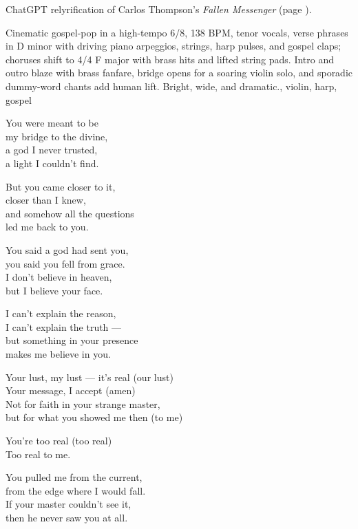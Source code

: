 
\begin{notes}
ChatGPT relyrification of Carlos Thompson's \emph{Fallen Messenger} (page \pageref{sec:fallen-messenger}).
\end{notes}
\begin{style}
Cinematic gospel-pop in a high-tempo 6/8, 138 BPM, tenor vocals, verse phrases in D minor with driving piano arpeggios, strings, harp pulses, and gospel claps; choruses shift to 4/4 F major with brass hits and lifted string pads. Intro and outro blaze with brass fanfare, bridge opens for a soaring violin solo, and sporadic dummy-word chants add human lift. Bright, wide, and dramatic., violin, harp, gospel
\end{style}
\begin{lyrics}

You were meant to be\\
my bridge to the divine,\\
a god I never trusted,\\
a light I couldn't find.

But you came closer to it,\\
closer than I knew,\\
and somehow all the questions\\
led me back to you.

You said a god had sent you,\\
you said you fell from grace.\\
I don't believe in heaven,\\
but I believe your face.

I can't explain the reason,\\
I can't explain the truth —\\
but something in your presence\\
makes me believe in you.

Your lust, my lust — it's real (our lust)\\
Your message, I accept (amen)\\
Not for faith in your strange master,\\
but for what you showed me then (to me)

You're too real (too real)\\
Too real to me.

You pulled me from the current,\\
from the edge where I would fall.\\
If your master couldn't see it,\\
then he never saw you at all.


\end{lyrics}
